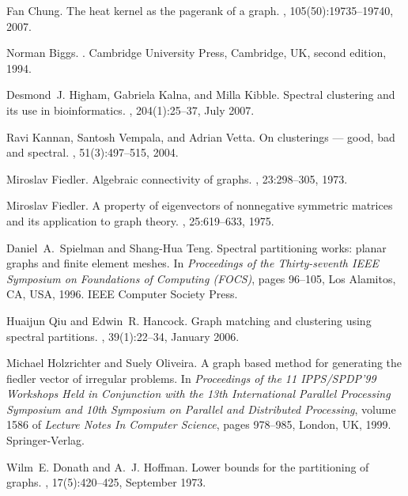 \documentclass{article}
\begin{document}
\begin{thebibliography}{10}
Fan Chung.
\newblock The heat kernel as the pagerank of a graph.
, 105(50):19735--19740, 2007.

Norman Biggs.
.
\newblock Cambridge University Press, Cambridge, UK, second edition, 1994.

Desmond~J. Higham, Gabriela Kalna, and Milla Kibble.
\newblock Spectral clustering and its use in bioinformatics.
,
  204(1):25--37, July 2007.

Ravi Kannan, Santosh Vempala, and Adrian Vetta.
\newblock On clusterings --- good, bad and spectral.
, 51(3):497--515, 2004.

Miroslav Fiedler.
\newblock Algebraic connectivity of graphs.
, 23:298--305, 1973.

Miroslav Fiedler.
\newblock A property of eigenvectors of nonnegative symmetric matrices and its
  application to graph theory.
, 25:619--633, 1975.

Daniel~A.\ Spielman and Shang-Hua Teng.
\newblock Spectral partitioning works: planar graphs and finite element meshes.
\newblock In {\em Proceedings of the Thirty-seventh {{IEEE}} Symposium on
  Foundations of Computing ({FOCS})}, pages 96--105, Los Alamitos, CA, {USA},
  1996. {{IEEE}} Computer Society Press.

Huaijun Qiu and Edwin~R. Hancock.
\newblock Graph matching and clustering using spectral partitions.
, 39(1):22--34, January 2006.

Michael Holzrichter and Suely Oliveira.
\newblock A graph based method for generating the fiedler vector of irregular
  problems.
\newblock In {\em Proceedings of the 11 IPPS/SPDP'99 Workshops Held in
  Conjunction with the 13th International Parallel Processing Symposium and
  10th Symposium on Parallel and Distributed Processing}, volume 1586 of {\em
  Lecture Notes In Computer Science}, pages 978--985, London, UK, 1999.
  Springer-Verlag.

Wilm~E. Donath and A.~J. Hoffman.
\newblock Lower bounds for the partitioning of graphs.
, 17(5):420--425,
  September 1973.


\end{thebibliography}
\end{document}
